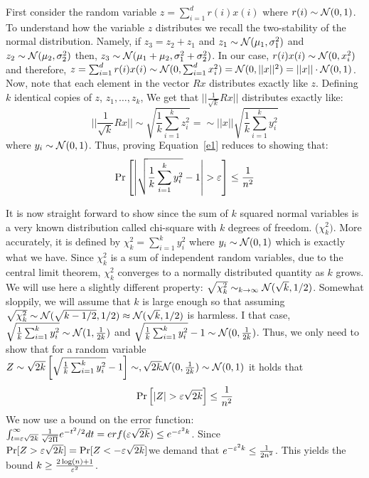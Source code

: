 \documentclass{article}
\begin{document}
First consider the random variable $z = \sum_{i=1}^{d}r(i)x(i)$ where $r(i) \sim {\mathcal{N}}(0,1)$. 
To understand how the variable $z$ distributes we recall the two-stability of the
normal distribution. Namely, if $z_3 = z_2 + z_1$ and $z_1 \sim {\mathcal{N}}(\mu_1,\sigma^{2}_{1})$ and $z_2 \sim {\mathcal{N}}(\mu_2,\sigma^{2}_{2})$ then, $z_3 \sim {\mathcal{N}}(\mu_1 + \mu_2,\sigma^{2}_{1} + \sigma^{2}_{2})$.
In our case,  $r(i)x(i) \sim {\mathcal{N}}(0,x^{2}_{i})$ and therefore, $z = \sum_{i=1}^{d}r(i)x(i) \sim {\mathcal{N}}(0,\sum_{i=1}^{d}x^{2}_{i}) = {\mathcal{N}}(0,||x||^{2}) =  ||x||\cdot{\mathcal{N}}(0,1)$. Now, note that each element in the vector $Rx$ distributes exactly like $z$.
Defining $k$ identical copies of $z$, $z_1,\ldots,z_k$,
We get that $||\frac{1}{\sqrt{k}}Rx||$ distributes exactly like:
\[
||\frac{1}{\sqrt{k}}Rx|| \sim \sqrt{\frac{1}{k}\sum_{i=1}^{k} z^{2}_{i}} = \sim ||x||\sqrt{\frac{1}{k}\sum_{i=1}^{k} y^{2}_{i}}
\]
where $y_i \sim {\mathcal{N}}(0,1)$.
Thus, proving Equation~\ref{e1} reduces to showing that:
\begin{equation}
\Pr\left[ \left| \sqrt{\frac{1}{k}\sum_{i=1}^{k} y^{2}_{i}} - 1 \right| > \varepsilon \right] \le \frac{1}{n^2} 
\end{equation}

It is now straight forward to show since the sum of $k$ squared normal variables is a very known distribution called chi-square with $k$ degrees of freedom. ($\chi^2_k)$.
More accurately, it is defined by $\chi^2_k = \sum_{i=1}^{k} y^{2}_{i}$ where $y_i \sim {\mathcal{N}}(0,1)$ which is exactly what we have.
Since $\chi^2_k$ is a sum of independent random variables, due to the central limit theorem, $\chi^2_k$ converges to a normally distributed quantity as $k$ grows. We will use here a slightly different property: 
$\sqrt{\chi^2_k} \sim_{k \rightarrow \infty} {\mathcal{N}}(\sqrt{k},1/2)$. Somewhat sloppily, we will assume that $k$ is large enough so that 
assuming $\sqrt{\chi^2_k} \sim {\mathcal{N}}(\sqrt{k-1/2},1/2) \approx {\mathcal{N}}(\sqrt{k},1/2)$ is harmless. I that case, $ \sqrt{\frac{1}{k}\sum_{i=1}^{k} y^{2}_{i}} \sim {\mathcal{N}}(1,\frac{1}{2k})$ and $ \sqrt{\frac{1}{k}\sum_{i=1}^{k} y^{2}_{i}} -1\sim {\mathcal{N}}(0,\frac{1}{2k})$.
Thus, we only need to show that for a random variable $Z \sim \sqrt{2k}\left[\sqrt{\frac{1}{k}\sum_{i=1}^{k} y^{2}_{i}} -1\right] \sim,\sqrt{2k}{\mathcal{N}}(0,\frac{1}{2k})  \sim {\mathcal{N}}(0,1)$ it holds that  
\begin{equation}
\Pr\left[ | Z | > \varepsilon \sqrt{2k}\right] \le \frac{1}{n^2} 
\end{equation}
We now use a bound on the error function: $\int_{t=\varepsilon \sqrt{2k}}^{\infty} \frac{1}{\sqrt{2\Pi}}e^{-t^2/2}dt = erf(\varepsilon \sqrt{2k}) \le e^{-\varepsilon^2k}$. Since $\Pr[Z  > \varepsilon \sqrt{2k}] = \Pr[Z  < -\varepsilon \sqrt{2k}] $we demand that $e^{-\varepsilon^2k} \le \frac{1}{2n^2}$. This yields the bound $k \ge \frac{2\log(n)+1}{\varepsilon^2}$.
\end{document}
